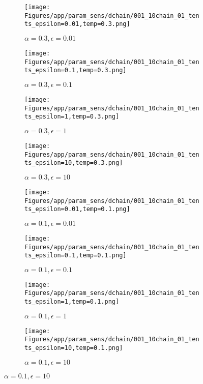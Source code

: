\documentclass{article}
\theoremstyle{plain}
\begin{document}
\begin{appendices}
\begin{figure}
                \begin{subfigure}[b]{0.24\textwidth}
                    \centering
                    \texttt{[image: Figures/app/param\_sens/dchain/001\_10chain\_01\_tents\_epsilon=0.01,temp=0.3.png]}
                    \caption*{$\alpha=0.3,\epsilon=0.01$}
                \end{subfigure}
                \begin{subfigure}[b]{0.24\textwidth}
                    \centering
                    \texttt{[image: Figures/app/param\_sens/dchain/001\_10chain\_01\_tents\_epsilon=0.1,temp=0.3.png]}
                    \caption*{$\alpha=0.3,\epsilon=0.1$}
                \end{subfigure}
                \begin{subfigure}[b]{0.24\textwidth}
                    \centering
                    \texttt{[image: Figures/app/param\_sens/dchain/001\_10chain\_01\_tents\_epsilon=1,temp=0.3.png]}
                    \caption*{$\alpha=0.3,\epsilon=1$}
                \end{subfigure}
                \begin{subfigure}[b]{0.24\textwidth}
                    \centering
                    \texttt{[image: Figures/app/param\_sens/dchain/001\_10chain\_01\_tents\_epsilon=10,temp=0.3.png]}
                    \caption*{$\alpha=0.3,\epsilon=10$}
                \end{subfigure}
                
                \begin{subfigure}[b]{0.24\textwidth}
                    \centering
                    \texttt{[image: Figures/app/param\_sens/dchain/001\_10chain\_01\_tents\_epsilon=0.01,temp=0.1.png]}
                    \caption*{$\alpha=0.1,\epsilon=0.01$}
                \end{subfigure}
                \begin{subfigure}[b]{0.24\textwidth}
                    \centering
                    \texttt{[image: Figures/app/param\_sens/dchain/001\_10chain\_01\_tents\_epsilon=0.1,temp=0.1.png]}
                    \caption*{$\alpha=0.1,\epsilon=0.1$}
                \end{subfigure}
                \begin{subfigure}[b]{0.24\textwidth}
                    \centering
                    \texttt{[image: Figures/app/param\_sens/dchain/001\_10chain\_01\_tents\_epsilon=1,temp=0.1.png]}
                    \caption*{$\alpha=0.1,\epsilon=1$}
                \end{subfigure}
                \begin{subfigure}[b]{0.24\textwidth}
                    \centering
                    \texttt{[image: Figures/app/param\_sens/dchain/001\_10chain\_01\_tents\_epsilon=10,temp=0.1.png]}
                    \caption*{$\alpha=0.1,\epsilon=10$}
                \end{subfigure}
                

\end{figure}
\end{appendices}
\end{document}
